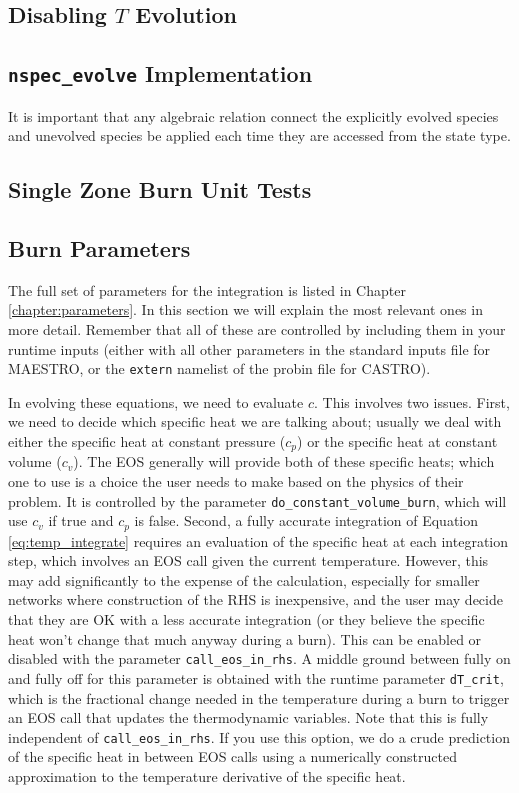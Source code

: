 \subsection{Disabling $T$ Evolution}


\subsection{{\tt nspec\_evolve} Implementation}

It is important that any algebraic relation connect the 
explicitly evolved species and unevolved species be applied each
time they are accessed from the state type.  



\subsection{Single Zone Burn Unit Tests}


\subsection{Burn Parameters}

The full set of parameters for the integration is listed in Chapter \ref{chapter:parameters}.
In this section we will explain the most relevant ones in more detail.
Remember that all of these are controlled by including them in your runtime
inputs (either with all other parameters in the standard inputs file for
MAESTRO, or the \texttt{extern} namelist of the probin file for CASTRO).

In evolving these equations, we need to evaluate $c$. This involves two
issues. First, we need to decide which specific heat we are talking about;
usually we deal with either the specific heat at constant pressure ($c_p$)
or the specific heat at constant volume ($c_v$). The EOS generally will
provide both of these specific heats; which one to use is a choice the user
needs to make based on the physics of their problem. It is controlled by the
parameter \texttt{do\_constant\_volume\_burn}, which will use $c_v$ if true
and $c_p$ is false. Second, a fully accurate integration of Equation
\ref{eq:temp_integrate} requires an evaluation of the specific heat at
each integration step, which involves an EOS call given the current temperature.
However, this may add significantly to the expense of the calculation,
especially for smaller networks where construction of the RHS is inexpensive,
and the user may decide that they are OK with a less accurate integration
(or they believe the specific heat won't change that much anyway during a burn).
This can be enabled or disabled with the parameter \texttt{call\_eos\_in\_rhs}.
A middle ground between fully on and fully off for this parameter is obtained
with the runtime parameter \texttt{dT\_crit}, which is the fractional change
needed in the temperature during a burn to trigger an EOS call that updates
the thermodynamic variables. Note that this is fully independent of
\texttt{call\_eos\_in\_rhs}. If you use this option, we do a crude prediction
of the specific heat in between EOS calls using a numerically constructed
approximation to the temperature derivative of the specific heat.

